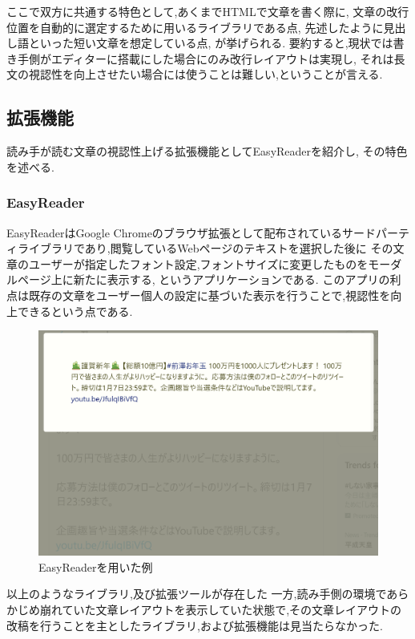 ここで双方に共通する特色として,あくまでHTMLで文章を書く際に, 文章の改行位置を自動的に選定するために用いるライブラリである点,
先述したように見出し語といった短い文章を想定している点, が挙げられる.
要約すると,現状では書き手側がエディターに搭載にした場合にのみ改行レイアウトは実現し,
それは長文の視認性を向上させたい場合には使うことは難しい,ということが言える.

\subsection{拡張機能}
読み手が読む文章の視認性上げる拡張機能としてEasyReaderを紹介し, その特色を述べる. \footnotemark[4]
\subsubsection{EasyReader}


EasyReaderはGoogle Chromeのブラウザ拡張として配布されているサードパーティライブラリであり,閲覧しているWebページのテキストを選択した後に
その文章のユーザーが指定したフォント設定,フォントサイズに変更したものをモーダルページ上に新たに表示する, というアプリケーションである.
このアプリの利点は既存の文章をユーザー個人の設定に基づいた表示を行うことで,視認性を向上できるという点である.

\begin{figure}[H]
    \centering
    \label{fig:image_5}
    \includegraphics[width=0.6\columnwidth]{image/02/img_5.png}
    \caption[EasyReaderを用いた例]{EasyReaderを用いた例}
\end{figure}

以上のようなライブラリ,及び拡張ツールが存在した
一方,読み手側の環境であらかじめ崩れていた文章レイアウトを表示していた状態で,その文章レイアウトの改稿を行うことを主としたライブラリ,および拡張機能は見当たらなかった.

